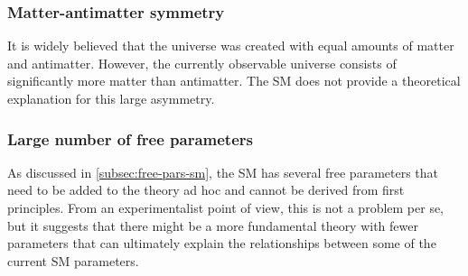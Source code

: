 
\subsubsection{Matter-antimatter symmetry}
It is widely believed that the universe was created with equal amounts of matter and antimatter.
However, the currently observable universe consists of significantly more matter than antimatter. 
The SM does not provide a theoretical explanation for this large asymmetry. 



\subsubsection{Large number of free parameters}
As discussed in \cref{subsec:free-pars-sm}, the SM has several free parameters that need to be added to the theory ad hoc and cannot be derived from first principles. 
From an experimentalist point of view, this is not a problem per se, but it suggests that there might be a more fundamental theory with fewer parameters that can ultimately explain the relationships between some of the current SM parameters.

